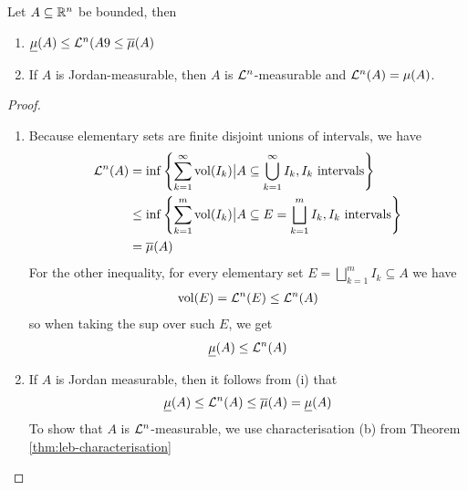 \begin{thm}[]
Let $A \subseteq \mathbb{R}^{n}$ be bounded, then
\begin{enumerate}
  \item $\underline{\mu}(A) \leq\mathcal{L}^{n}(A9 \leq \overline{\mu}(A)$
  \item If $A$ is Jordan-measurable, then $A$ is $\mathcal{L}^{n}$-measurable and $\mathcal{L}^{n}(A) = \mu(A)$.
\end{enumerate}
\end{thm}
\begin{proof}
\begin{enumerate}
  \item Because elementary sets are finite disjoint unions of intervals, we have
    \begin{align*}
      \mathcal{L}^{n}(A) 
      &= \inf \left\{
        \sum_{k=1}^{\infty}\operatorname{vol}(I_k) \big\vert A \subseteq \bigcup_{k=1}^{\infty}I_k, I_k \text{ intervals}
      \right\}
      \\
      &\leq
      \inf \left\{
        \sum_{k=1}^{m}\operatorname{vol}(I_k) \big\vert A \subseteq E = \bigsqcup_{k=1}^{m}I_k, I_k \text{ intervals}
      \right\}
      \\
      &= \overline{\mu}(A)
    \end{align*}
    For the other inequality, for every elementary set $E = \bigsqcup_{k=1}^{m}I_k \subseteq A$ we have
    \begin{align*}
      \operatorname{vol}(E) = \mathcal{L}^{n}(E) \leq \mathcal{L}^{n}(A)
    \end{align*}
    so when taking the sup over such $E$, we get
    \begin{align*}
      \underline{\mu}(A) \leq \mathcal{L}^{n}(A)
    \end{align*}


  \item If $A$ is Jordan measurable, then it follows from (i) that
    \begin{align*}
      \underline{\mu}(A) \leq \mathcal{L}^{n}(A) \leq \overline{\mu}(A) = \underline{\mu}(A)
    \end{align*}
    To show that $A$ is $\mathcal{L}^{n}$-measurable, we use characterisation (b) from Theorem \ref{thm:leb-characterisation}


\end{enumerate}
\end{proof}
